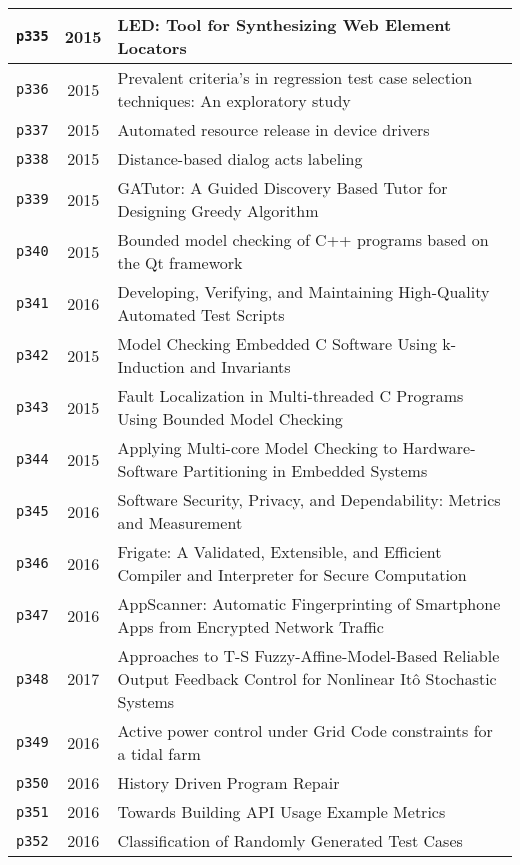 \begin{longtable}{| c | c | p{16cm} |}
  \hline
  \texttt{p335} & 2015 & LED: Tool for Synthesizing Web Element Locators \\
  \hline
  \texttt{p336} & 2015 & Prevalent criteria's in regression test case selection techniques: An exploratory study \\
  \hline
  \texttt{p337} & 2015 & Automated resource release in device drivers \\
  \hline
  \texttt{p338} & 2015 & Distance-based dialog acts labeling \\
  \hline
  \texttt{p339} & 2015 & GATutor: A Guided Discovery Based Tutor for Designing Greedy Algorithm \\
  \hline
  \texttt{p340} & 2015 & Bounded model checking of C++ programs based on the Qt framework \\
  \hline
  \texttt{p341} & 2016 & Developing, Verifying, and Maintaining High-Quality Automated Test Scripts \\
  \hline
  \texttt{p342} & 2015 & Model Checking Embedded C Software Using k-Induction and Invariants \\
  \hline
  \texttt{p343} & 2015 & Fault Localization in Multi-threaded C Programs Using Bounded Model Checking \\
  \hline
  \texttt{p344} & 2015 & Applying Multi-core Model Checking to Hardware-Software Partitioning in Embedded Systems \\
  \hline
  \texttt{p345} & 2016 & Software Security, Privacy, and Dependability: Metrics and Measurement \\
  \hline
  \texttt{p346} & 2016 & Frigate: A Validated, Extensible, and Efficient Compiler and Interpreter for Secure Computation \\
  \hline
  \texttt{p347} & 2016 & AppScanner: Automatic Fingerprinting of Smartphone Apps from Encrypted Network Traffic \\
  \hline
  \texttt{p348} & 2017 & Approaches to T-S Fuzzy-Affine-Model-Based Reliable Output Feedback Control for Nonlinear Itô Stochastic Systems \\
  \hline
  \texttt{p349} & 2016 & Active power control under Grid Code constraints for a tidal farm \\
  \hline
  \texttt{p350} & 2016 & History Driven Program Repair \\
  \hline
  \texttt{p351} & 2016 & Towards Building API Usage Example Metrics \\
  \hline
  \texttt{p352} & 2016 & Classification of Randomly Generated Test Cases \\

\end{longtable}
